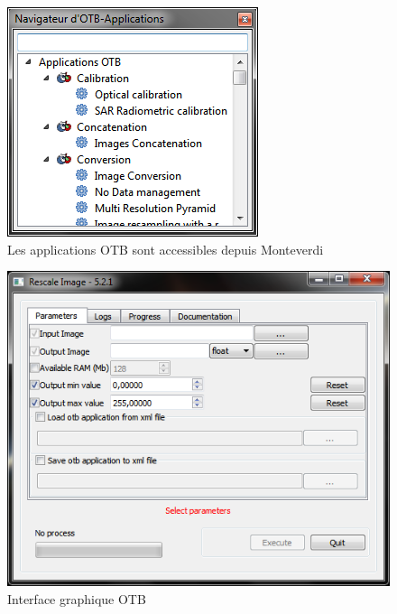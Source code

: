 \documentclass[10pt,a4paper]{article}
\begin{document}
\begin{figure}[h]
  \center
  \includegraphics[scale=1]{Art/windows-mapla.png}
  \caption[]{Les applications OTB sont accessibles depuis Monteverdi}
  \label{fig:windows-mapla}
\end{figure}

\begin{figure}[h]
  \center
  \includegraphics[scale=1]{Art/windows-otbgui.png}
  \caption[]{Interface graphique OTB}
  \label{fig:windows-otbgui}
\end{figure}
\end{document}
